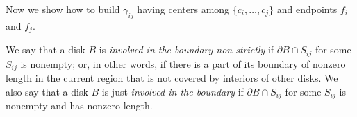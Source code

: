 Now we show how to build $\gamma_{ij}$ having centers among $\{c_i, \ldots, c_j\}$ and endpoints $f_i$ and $f_j$.


We say that a disk $B$ is \textit{involved in the boundary non-strictly} if $\partial{B}\cap S_{ij}$ for some $S_{ij}$ is nonempty; or, in other words, if there is a part of its boundary of nonzero length in the current region that is not covered by interiors of other disks. We also say that a disk $B$ is just \textit{involved in the boundary} if $\partial{B}\cap S_{ij}$ for some $S_{ij}$ is nonempty and has nonzero length. %


